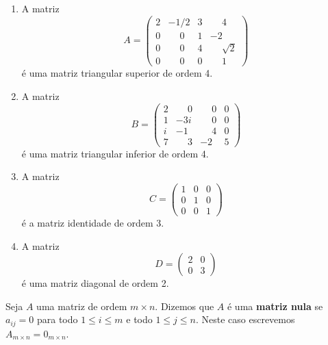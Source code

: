 \begin{exemplos}
    \begin{enumerate}
        \item A matriz
            \[
                A = \begin{pmatrix}
                    2 & -1/2 & 3 & \phantom{-}4\\
                    0 & \phantom{-}0 & 1 & -2\\
                    0 & \phantom{-}0 & 4 & \phantom{-}\sqrt{2}\\
                    0 & \phantom{-}0 & 0 & \phantom{-}1
                \end{pmatrix}
            \]
        é uma matriz triangular superior de ordem 4.
        \item A matriz
            \[
                B = \begin{pmatrix}
                    2 & \phantom{-}0 & \phantom{-}0 & 0\\
                    1 & -3i & \phantom{-}0 & 0\\
                    i & -1 & \phantom{-}4 & 0\\
                    7 & \phantom{-}3 & -2 & 5
                \end{pmatrix}
            \]
        é uma matriz triangular inferior de ordem 4.
        \item A matriz
            \[
                C = \begin{pmatrix}
                    1 & 0 & 0\\
                    0 & 1 & 0\\
                    0 & 0 & 1
                \end{pmatrix}
            \]
        é a matriz identidade de ordem 3.
        \item A matriz
            \[
                D = \begin{pmatrix}
                    2 & 0\\
                    0 & 3
                \end{pmatrix}
            \]
        é uma matriz diagonal de ordem 2.
    \end{enumerate}
\end{exemplos}

\begin{definicao}
    Seja $A$ uma matriz de ordem $m \times n$. Dizemos que $A$ é uma \textbf{matriz nula} se $a_{ij} = 0$ para todo $1 \le i \le m$ e todo $1 \le j
    \le n$. Neste caso escrevemos $A_{m \times n} = 0_{m \times n}$.
\end{definicao}

